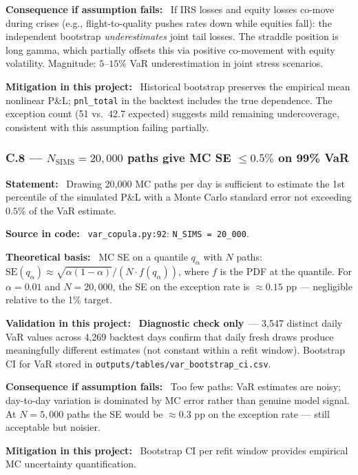 \documentclass[11pt,a4paper]{article}
\newcommand{\asmfield}[1]{\medskip\noindent\textbf{#1:}\ }
\newcommand{\code}[1]{\texttt{#1}}
\newcommand{\diagnostic}{\textbf{Diagnostic check only}}
\begin{document}
\asmfield{Consequence if assumption fails}
If IRS losses and equity losses co-move during crises (e.g., flight-to-quality
pushes rates down while equities fall): the independent bootstrap
\emph{underestimates} joint tail losses. The straddle position is long
gamma, which partially offsets this via positive co-movement with equity
volatility. Magnitude: $5$--$15\%$ VaR underestimation in joint stress scenarios.

\asmfield{Mitigation in this project}
Historical bootstrap preserves the empirical mean nonlinear P\&L;
\code{pnl\_total} in the backtest includes the true dependence. The
exception count (51 vs.\ 42.7 expected) suggests mild remaining
undercoverage, consistent with this assumption failing partially.

\subsubsection{C.8 --- $N_{\mathrm{SIMS}} = 20{,}000$ paths give MC SE $\le 0.5\%$ on 99\% VaR}\label{asm:C8}

\asmfield{Statement}
Drawing 20{,}000 MC paths per day is sufficient to estimate the 1st
percentile of the simulated P\&L with a Monte Carlo standard error not
exceeding $0.5\%$ of the VaR estimate.

\asmfield{Source in code}
\code{var\_copula.py:92}: \lstinline|N_SIMS = 20_000|.

\asmfield{Theoretical basis}
MC SE on a quantile $q_\alpha$ with $N$ paths:
$\text{SE}(q_\alpha) \approx \sqrt{\alpha(1-\alpha)} / (N \cdot f(q_\alpha))$,
where $f$ is the PDF at the quantile. For $\alpha = 0.01$ and $N = 20{,}000$,
the SE on the exception rate is $\approx 0.15$ pp --- negligible relative
to the 1\% target.

\asmfield{Validation in this project}
\diagnostic\ --- 3{,}547 distinct daily VaR values across 4{,}269 backtest
days confirm that daily fresh draws produce meaningfully different estimates
(not constant within a refit window). Bootstrap CI for VaR stored in
\code{outputs/tables/var\_bootstrap\_ci.csv}.

\asmfield{Consequence if assumption fails}
Too few paths: VaR estimates are noisy; day-to-day variation is dominated
by MC error rather than genuine model signal. At $N = 5{,}000$ paths the
SE would be $\approx 0.3$ pp on the exception rate --- still acceptable but
noisier.

\asmfield{Mitigation in this project}
Bootstrap CI per refit window provides empirical MC uncertainty quantification.
\end{document}
